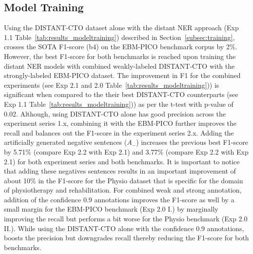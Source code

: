 \documentclass[letterpaper]{article} %
\begin{document}
\subsection{Model Training}
\label{subsec:res_mod}
%
Using the DISTANT-CTO dataset alone with the distant NER approach (Exp 1.1 Table~\ref{tab:results_modeltraining}) described in Section~\ref{subsec:training}, crosses the SOTA F1-score (b4) on the EBM-PICO benchmark corpus by 2\%.
However, the best F1-score for both benchmarks is reached upon training the distant NER models with combined weakly-labeled DISTANT-CTO with the strongly-labeled EBM-PICO dataset.
The improvement in F1 for the combined experiments (see Exp 2.1 and 2.0 Table~\ref{tab:results_modeltraining})) is significant when compared to the their best DISTANT-CTO counterparts (see Exp 1.1 Table~\ref{tab:results_modeltraining})) as per the t-test with p-value of 0.02.
Although, using DISTANT-CTO alone has good precision across the experiment series 1.x, combining it with the EBM-PICO further improves the recall and balances out the F1-score in the experiment series 2.x.
Adding the artificially generated negative sentences ($A_{-}$) increases the previous best F1-score by 5.71\% (compare Exp 2.2 with Exp 2.1) and 3.77\% (compare Exp 2.2 with Exp 2.1) for both experiment series and both benchmarks.
It is important to notice that adding these negatives sentences results in an important improvement of about 10\% in the F1-score for the Physio dataset that is specific for the domain of physiotherapy and rehabilitation.
For combined weak and strong annotation, addition of the confidence 0.9 annotations improves the F1-score as well by a small margin for the EBM-PICO benchmark (Exp 2.0 I.) by marginally improving the recall but performs a bit worse for the Physio benchmark (Exp 2.0 II.).
While using the DISTANT-CTO alone with the confidence 0.9 annotations, boosts the precision but downgrades recall thereby reducing the F1-score for both benchmarks.
%
%
%
\end{document}
